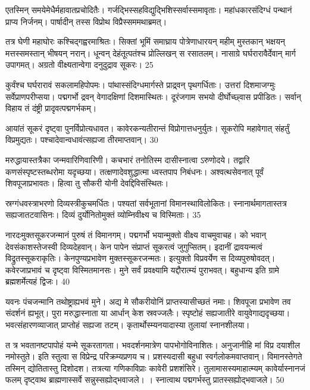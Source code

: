 एतस्मिन् समयेमेधैर्महावातप्रचोदितैः।
गर्जद्भिस्सहविद्युद्भिशिस्सर्वास्समावृताः।
महांधकारसंदिग्धं पन्थानं प्राप्य निर्जनम्।
पार्षादीन् तस्स विप्रोथ विप्रैस्सममथाब्रमत्।

तत्र घेणी महाघोरः कश्चिद्गह्वरमाश्रितः।
सिक्तां भूमिं समाघ्राय पोत्रेणाधारयन् महीम् मुस्तकान् भक्षयन् मत्तस्समस्तान् भीषयन् नरान्।
धून्वन् देहंतूत्पतंश्च प्रोल्लिखन् स रसातलम्।
नासाग्रे घर्घरारावैर्देवान् मार्ग उपागमत्।
अग्रतो वीक्ष्यतान्वेगा दनुदुद्राव सूकरः।
25

कुर्वंश्च घर्घरारावं सकलामहिपोपमः।
पांथास्संदिग्धमार्गस्ते प्राद्र्वन् पृथगर्धिताः।
उत्तरां दिशमाजग्मुः सर्वेप्राणपरीप्सया।
पद्मगर्भो द्रवन् वेगादक्षिणां दिशमास्थितः।
दूरंजगाम सभयो दीर्घोच्छ्वास प्रपीडितः।
सर्वान् विहाय तं दंष्ट्री प्रादृवत्पद्मगर्भकम्।

आयांतं सूकरं दृष्ट्वा पुनर्विप्रोत्यधावत।
कावेरकन्यतीरान्तं विप्रोगात्तधनुर्युतः।
सूकरोपि महावेगात् संहर्तुं विप्रमुद्यतः।
पश्चादेवान्वधावंत्सह्यजा तीरमाप्तवान्।
30

मरुद्धायास्तत्रैका जन्मवारिणिवारिणी।
कचभारं तनोतिस्म दासीस्नात्वा ऽरुणोदये।
तद्वारि कणसंस्पृष्टस्तब्धरोमा यदृच्छया।
तत्क्षणादेवशुद्धात्मा ध्वस्तपाप निबंधनः।
अश्वत्थसेवनात् पूर्वं शिवपूजाप्रभावतः।
हित्वा तु सौकरी योनी देवद्दिविसंस्थितः।

स्रग्गंधवस्त्राभरणो दिव्यस्त्रीकुचमर्धितः।
पश्यतां सर्वभूतानां विमानस्थाविलोकितः।
स्नानार्थमागतास्तत्र सह्यजातटवासिनः।
दिव्यं दुर्योनितोमुक्तं व्योम्निवीक्ष्य च विस्मिताः।
35

नारदःमुक्तसूकरजन्मानं पुरुषं तं विमानगम्।
पद्मगर्भो भयान्मुक्तो वीक्ष्य वाचमुवाचह।
को भवान् देवसंकाशस्तेजस्वी दिव्यदेहवान्।
केन पापेन संप्राप्तं सूकरत्वं जुगुप्सितम्।
इदानीं द्रावयन्मत्वं विद्रुतस्सूकराकृतिः।
केनपुण्यप्रभावेण मुक्तस्सूकरजन्मतः।
इत्युक्तो विप्रवर्येण स दिव्यपुरुषोवदत्।
कवेरजाप्रभावं च दृष्ट्वा विस्मितमानसः।
मुने सर्वं प्रवक्ष्यामि यद्दौरात्म्यं पुराभवत्।
बहुधान्य इति ग्रामे ब्रह्मशर्मेत्यहं द्विजः।
40

यवनः पंचजन्मानि तथोष्ट्राह्यभवं मुने।
अद्य मे सौकरीयोनिं प्राप्तस्यासीच्छतं नमाः।
शिवपूजा प्रभावेण तव संदर्शनं ह्यभूत्।
पुरा मरुद्धास्नाता या आर्धान् केश स्रवज्जलैः।
स्पृष्टोहं सह्यजातीरे वायुवेगाद्यदृच्छया।
भवत्संहारणव्याजात् प्राप्तोहं सह्यजा तटम्।
कृतार्थोस्म्यनयादास्या तुलायां स्नानशीलया।

त
त्र
भवतानष्टपापोहं यन्मे सूकरतागता।
भवदर्शनमात्रेण पापभोगोविनाशितः।
अनुजानीहि मां विप्र दयाशील नमोस्तुते।
इति स्तुत्वा स विप्रेन्द्र परिक्रम्यप्रणय च।
प्रशस्यदासी बहुधा स्वर्गलोकमवाप्तवान्।
विमानस्तेगते तस्मिन् द्योतितास्तु दिशोदश।
तत्रत्या गणिकाविप्राः कावेरी प्रशशंसिरे।
तुलामासस्यमाहात्म्यम् कावेर्यास्नानजं फलम् दृष्ट्वाथ ब्राह्मणास्सर्वे सन्नुस्सह्योद्भवाजले।
।
स्नात्वाथ पद्मगर्भस्तु प्रातस्सह्योद्भवाजले।
50

